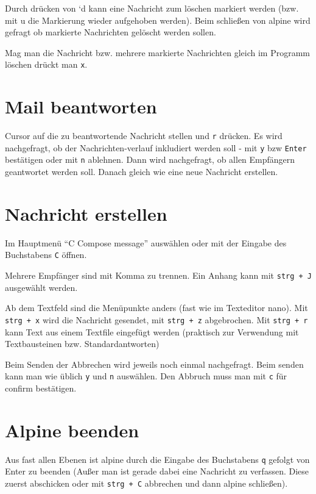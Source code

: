 \documentclass[]{book}
\begin{document}
Durch drücken von `d kann eine Nachricht zum löschen markiert werden (bzw. mit u die Markierung wieder aufgehoben werden). Beim schließen von alpine wird gefragt ob markierte Nachrichten gelöscht werden sollen.

Mag man die Nachricht bzw. mehrere markierte Nachrichten gleich im Programm löschen drückt man \texttt{x}.

\hypertarget{mail-beantworten}{%
\section{Mail beantworten}\label{mail-beantworten}}

Cursor auf die zu beantwortende Nachricht stellen und \texttt{r} drücken. Es wird nachgefragt, ob der Nachrichten-verlauf inkludiert werden soll - mit \texttt{y} bzw \texttt{Enter} bestätigen oder mit \texttt{n} ablehnen.
Dann wird nachgefragt, ob allen Empfängern geantwortet werden soll.
Danach gleich wie eine neue Nachricht erstellen.

\hypertarget{nachricht-erstellen}{%
\section{Nachricht erstellen}\label{nachricht-erstellen}}

Im Hauptmenü ``C Compose message'' auswählen oder mit der Eingabe des Buchstabens \texttt{C} öffnen.

Mehrere Empfänger sind mit Komma zu trennen.
Ein Anhang kann mit \texttt{strg\ +\ J} ausgewählt werden.

Ab dem Textfeld sind die Menüpunkte anders (fast wie im Texteditor nano). Mit \texttt{strg\ +\ x} wird die Nachricht gesendet, mit \texttt{strg\ +\ z} abgebrochen. Mit \texttt{strg\ +\ r} kann Text aus einem Textfile eingefügt werden (praktisch zur Verwendung mit Textbausteinen bzw. Standardantworten)

Beim Senden der Abbrechen wird jeweils noch einmal nachgefragt. Beim senden kann man wie üblich \texttt{y} und \texttt{n} auswählen. Den Abbruch muss man mit \texttt{c} für confirm bestätigen.

\hypertarget{alpine-beenden}{%
\section{Alpine beenden}\label{alpine-beenden}}

Aus fast allen Ebenen ist alpine durch die Eingabe des Buchstabens \texttt{q} gefolgt von Enter zu beenden (Außer man ist gerade dabei eine Nachricht zu verfassen. Diese zuerst abschicken oder mit \texttt{strg\ +\ C} abbrechen und dann alpine schließen).
\end{document}
